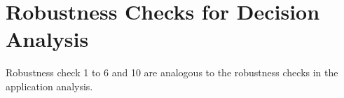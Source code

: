 \documentclass[11pt,a4paper]{scrartcl}
\begin{document}
\clearpage
\FloatBarrier



\clearpage
\FloatBarrier


\clearpage
\FloatBarrier





\clearpage
\FloatBarrier
\section{Robustness Checks for Decision Analysis}
Robustness check 1 to 6 and 10 are analogous to the robustness checks in the application analysis.
\end{document}
